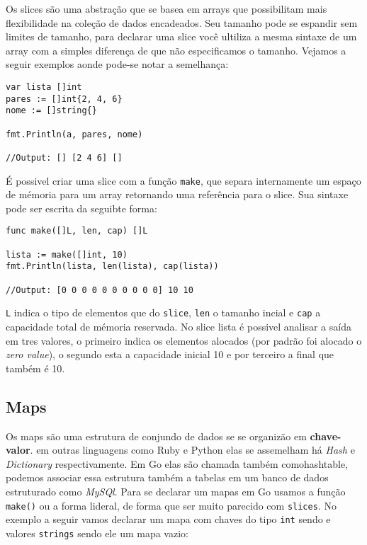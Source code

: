 \documentclass{SBCbookchapter}
\begin{document}
Os slices são uma abstração que se basea em arrays que possibilitam mais flexibilidade na coleção de dados encadeados. Seu tamanho pode se espandir sem limites de tamanho, para declarar uma slice você ultiliza a mesma sintaxe de um array com a simples diferença de que não especificamos o tamanho. Vejamos a seguir exemplos aonde pode-se notar a semelhança:


\begin{lstlisting}
var lista []int
pares := []int{2, 4, 6}
nome := []string{}

fmt.Println(a, pares, nome)

//Output: [] [2 4 6] []
\end{lstlisting}

É possivel criar uma slice com a função \texttt{make}, que separa internamente um espaço de mémoria para um array retornando uma referência para o slice. Sua sintaxe pode ser escrita da seguibte forma:

\begin{lstlisting}
func make([]L, len, cap) []L

lista := make([]int, 10)
fmt.Println(lista, len(lista), cap(lista))

//Output: [0 0 0 0 0 0 0 0 0 0] 10 10

\end{lstlisting}

\texttt{L} indica o tipo de elementos que do \texttt{slice}, \texttt{len} o tamanho incial e \texttt{cap} a capacidade total de mémoria reservada. No slice lista é possivel analisar a saída em tres valores, o primeiro indica os elementos alocados (por padrão foi alocado o \textit{zero value}), o segundo esta a capacidade inicial 10 e por terceiro a final que também é 10.  

\subsection{Maps}

Os maps são uma estrutura de conjundo de dados se se organizão em \textbf{chave-valor}. em outras linguagens como Ruby e Python elas se assemelham há \textit{Hash} e \textit{Dictionary} respectivamente. Em Go elas são chamada também comohashtable, podemos associar essa estrutura também a tabelas em um banco de dados estruturado como \textit{MySQl}. Para se declarar um mapas em Go usamos a função \texttt{make()} ou a forma lideral, de forma que ser muito parecido com \texttt{slices}. No exemplo a seguir vamos declarar um mapa com chaves do tipo \texttt{int} sendo e valores \texttt{strings} sendo ele um mapa vazio:
\end{document}
